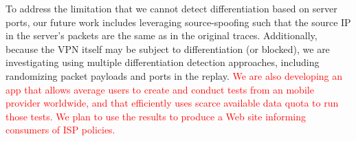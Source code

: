 \documentclass[letterpaper]{sig-alternate-2013}
\newcommand{\edit}[1]{\textcolor{red}{#1}}
\newcommand{\edit}[1]{\textcolor{black}{#1}}
\begin{document}
To address the limitation that we cannot detect differentiation based on server ports, our future work includes leveraging source-spoofing such that the source IP in the server's packets are the same as in the original traces. Additionally, because the VPN itself may be subject to differentiation (or blocked), we are investigating using multiple differentiation detection approaches, including randomizing packet payloads and ports in the replay.
%
\edit{We are also developing an app that allows average users to create and conduct tests from an mobile provider worldwide, and that efficiently uses scarce available data quota to run those tests. We plan to use the results to produce a Web site informing consumers of ISP policies.}


\begin{small}
	
	
\end{small}
\end{document}

